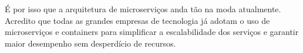 \documentclass[
	12pt,				%
	openright,			%
	oneside,			%
	a4paper,			%
	chapter=TITLE,		%
	section=TITLE,		%
	english,			%
	french,				%
	spanish,			%
	brazil				%
	]{abntex2}
\begin{document}
É por isso que a arquitetura de microserviços anda tão na moda atualmente. Acredito que todas as grandes empresas de tecnologia já adotam o uso de microserviços e containers para simplificar a escalabilidade dos serviços e garantir maior desempenho sem desperdício de recursos.





%
%


\end{document}

